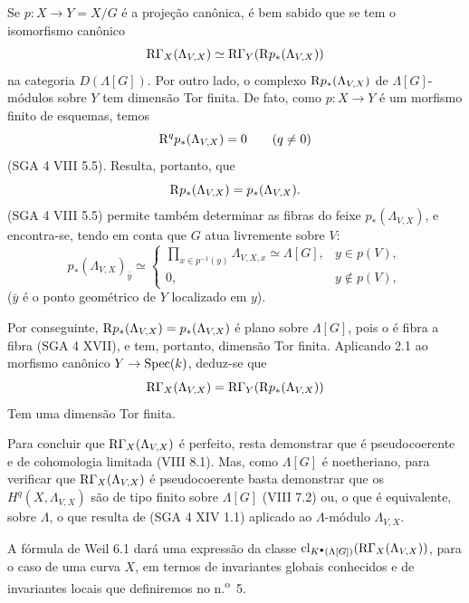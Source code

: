 \begin{prooftext}[Demonstração]
Se $p:X\to Y=X/G$ é a projeção canônica, é bem sabido que se tem o isomorfismo canônico
\[
\mathrm{R}\Gamma_X(\Lambda_{V,X})\simeq \mathrm{R}\Gamma_Y(\mathrm{R} p_*(\Lambda_{V,X}))
\]
na categoria $D(\Lambda[G])$. Por outro lado, o complexo $\mathrm{R} p_*(\Lambda_{V,X})$ de $\Lambda[G]$-módulos sobre $Y$ tem dimensão Tor finita. De fato, como $p:X\to Y$ é um morfismo finito de esquemas, temos
\[
\mathrm{R}^q p_*(\Lambda_{V,X})=0\qquad(q\ne0)
\]
(SGA 4 VIII 5.5). Resulta, portanto, que
\[
\mathrm{R} p_*(\Lambda_{V,X})=p_*(\Lambda_{V,X}).
\]
(SGA 4 VIII 5.5) permite também determinar as fibras do feixe $p_*(\Lambda_{V,X})$, e encontra-se, tendo em conta que $G$ atua livremente sobre $V$:
\[
p_*(\Lambda_{V,X})_{\bar y}\simeq
\begin{cases}
\displaystyle \prod_{x\in p^{-1}(y)}\Lambda_{V,X,x}\simeq \Lambda[G],& y\in p(V),\\[1em]
0,& y\notin p(V),
\end{cases}
\]
($\bar y$ é o ponto geométrico de $Y$ localizado em $y$).

Por conseguinte, $\mathrm{R} p_*(\Lambda_{V,X})=p_*(\Lambda_{V,X})$ é plano sobre $\Lambda[G]$, pois o é fibra a fibra (SGA 4 XVII), e tem, portanto, dimensão Tor finita. Aplicando 2.1 ao morfismo canônico $Y\to\operatorname{Spec}(k)$, deduz-se que
\[
\mathrm{R}\Gamma_X(\Lambda_{V,X})=\mathrm{R}\Gamma_Y(\mathrm{R} p_*(\Lambda_{V,X}))
\]
Tem uma dimensão Tor finita.

Para concluir que $\mathrm{R}\Gamma_X(\Lambda_{V,X})$ é perfeito, resta demonstrar que é pseudocoerente e de cohomologia limitada (VIII 8.1). Mas, como $\Lambda[G]$ é noetheriano, para verificar que $\mathrm{R}\Gamma_X(\Lambda_{V,X})$ é pseudocoerente basta demonstrar que os $H^q(X,\Lambda_{V,X})$ são de tipo finito sobre $\Lambda[G]$ (VIII 7.2) ou, o que é equivalente, sobre $\Lambda$, o que resulta de (SGA 4 XIV 1.1) aplicado ao $\Lambda$-módulo $\Lambda_{V,X}$.
\end{prooftext}

A fórmula de Weil 6.1 dará uma expressão da classe $\operatorname{cl}_{K^\bullet(\Lambda[G])}(\mathrm{R}\Gamma_X(\Lambda_{V,X}))$, para o caso de uma curva $X$, em termos de invariantes globais conhecidos e de invariantes locais que definiremos no n.\textsuperscript{o}~5.
